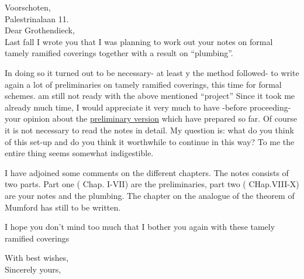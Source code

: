 Voorschoten, \\
Palestrinalaan 11.\\

Dear Grothendieck,\\

Last fall I wrote you that I was planning to work out your notes on formal tamely ramified coverings together with a result on ``plumbing''.

In doing so it turned out to be necessary- at least y the method  followed- to write again a lot of preliminaries on tamely ramified coverings, this time for formal schemes.  am still not ready with the above mentioned ``project''\handwritten{!} Since it took me already much time, I would appreciate it very much to have -before proceeding- your opinion about the \uline{preliminary version} which  have prepared so far. Of course it is not necessary to read the notes in detail. My question is: what do you think of this set-up and do you think it worthwhile to continue in this way? To me the entire thing seems somewhat indigestible.

I have adjoined some comments on the different chapters. The notes consists of two parts. Part one ( Chap. I-VII) are the preliminaries, part two ( CHap.VIII-X) are your notes and the plumbing. The chapter on the analogue of the theorem of Mumford has still to be written.

I hope you don't mind too much that I bother you again with these tamely ramified coverings\handwritten{!}

With best wishes,\\
Sincerely yours,\\
\\
